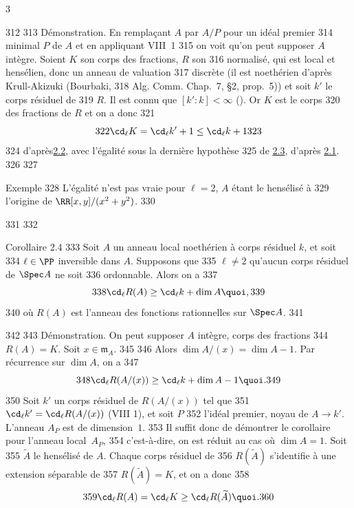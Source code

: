 3	\documentclass[10pt]{../fichiers-configuration-latex/smfart}
\begin{document}
   312	
   313	Démonstration. En remplaçant $A$ par $A/P$ pour un idéal premier
   314	minimal $P$ de $A$ et en appliquant VIII 1 %
   315	on voit qu'on peut supposer $A$ intègre. Soient $K$ son corps des fractions, $R$ son
   316	normalisé, qui est local et hensélien, donc un anneau de valuation
   317	discrète (il est noethérien d'après Krull-Akizuki (Bourbaki,
   318	Alg. Comm. Chap.~7, \S 2, prop.~5)) et soit $k'$ le corps résiduel de
   319	$R$. Il est connu que $[k':k]<\infty$ (\loccit). Or $K$ est le corps
   320	des fractions de $R$ et on a donc
   321	$$
   322	\cd_{\ell}K=\cd_{\ell}k'+1\leq \cd_{\ell}k+1
   323	$$
   324	d'après\pageoriginale \hyperref[X.thm2.2]{2.2}, avec l'égalité sous la dernière hypothèse
   325	de \hyperref[X.thm2.3]{2.3}, d'après \hyperref[X.thm2.1]{2.1}.
   326	
   327	\begin{enonce*}[remark]{Exemple}
   328	L'égalité n'est pas vraie pour $\ell=2$, $A$ étant le hensélisé à
   329	l'origine de $\RR[x,y]/(x^2+y^2)$.
   330	\end{enonce*}
   331	
   332	\begin{enonce*}{Corollaire 2.4}
   333	Soit $A$ un anneau local noethérien à corps résiduel $k$, et soit
   334	$\ell\in \PP$ inversible dans $A$. Supposons que
   335	$\ell\neq 2$  qu'aucun corps résiduel de $\Spec A$ ne soit
   336	ordonnable. Alors on a
   337	$$
   338	\cd_{\ell}R(A)\geq \cd_{\ell}k+\dim A{\quoi},
   339	$$
   340	où $R(A)$ est l'anneau des fonctions rationnelles sur $\Spec A$.
   341	\end{enonce*}
   342	
   343	Démonstration. On peut supposer $A$ intègre,  corps des fractions
   344	$R(A)=K$. Soit $x\in 𝔪_A$.
   345	%
   346	Alors $\dim A/(x)=\dim A-1$. Par récurrence sur $\dim A$, on a
   347	$$
   348	\cd_{\ell}R(A/(x))\geq \cd_{\ell}k+\dim A-1{\quoi}.
   349	$$
   350	Soit $k'$ un corps résiduel de $R(A/(x))$ tel que
   351	$\cd_{\ell}k'=\cd_{\ell}R(A/(x))$ (\cf VIII 1), et soit $P$ %
   352	l'idéal premier, noyau de $A\rightarrow k'$. L'anneau $A_P$ est de dimension $1$.
   353	Il suffit donc de démontrer le corollaire pour l'anneau local $A_P$,
   354	c'est-à-dire, on est réduit au cas où $\dim A=1$. Soit
   355	$\widetilde{A}$ le hensélisé de $A$. Chaque corps résiduel de
   356	$R(\widetilde{A})$ s'identifie à une extension séparable de
   357	$R(\widetilde{A})=K$, et on a donc
   358	$$
   359	\cd_{\ell}R(A)=\cd_{\ell}K\geq \cd_{\ell}R(\widetilde{A}){\quoi}.
   360	$$
\end{document}
